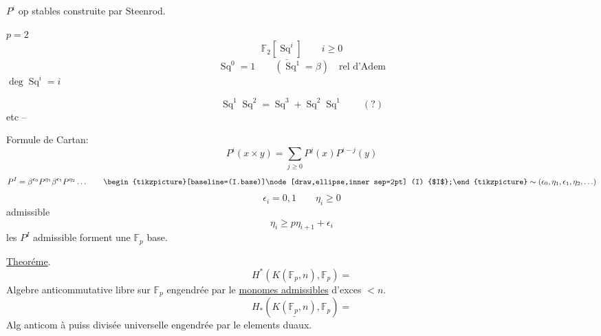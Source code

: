 $P^i$ op stables construite par Steenrod.

$p=2$
\[
\mathbb F_2\underline{[\operatorname{Sq}^i]}\qquad i\geq0
\]
\[
\operatorname{Sq}^0=1\qquad(\operatorname{Sq}^1=\beta)\quad\text{rel d'Adem}
\]
$\deg\operatorname{Sq}^i=i$

\[
\operatorname{Sq}^1\operatorname{Sq}^2=\operatorname{Sq}^3+\operatorname{Sq}^2\operatorname{Sq}^1\qquad(?)
\]
etc --

Formule de Cartan:
\[
P^i(x\times y)=\sum_{j\geq0}P^j(x)P^{i-j}(y)
\]
\[
P^I=\beta^{\epsilon_0}P^{\eta_1}\beta^{\epsilon_1}P^{\eta_2}\ldots
\qquad\mathord{\begin{tikzpicture}[baseline=(I.base)]\node[draw,ellipse,inner sep=2pt] (I) {$I$};\end{tikzpicture}}\sim(\epsilon_0,\eta_1,\epsilon_1,\eta_2,\ldots)
\]
\[
\epsilon_i=0,1\qquad\eta_i\geq0
\]
admissible
\[
\eta_i\geq p\eta_{i+1}+\epsilon_i
\]
les $P^I$ admissible forment une $\mathbb F_p$ base.

\uline{Theoréme}.
\[
H^*(K(\mathbb F_p,n),\mathbb F_p)=
\]
Algebre anticommutative libre sur $\mathbb F_p$ engendrée par le \uline{monomes admissibles} d'exces $<n$.
\[
H_*(\underline{K(\mathbb F_p,n)},\mathbb F_p)=
\]
Alg anticom à puiss divisée universelle engendrée par le elements duaux.
